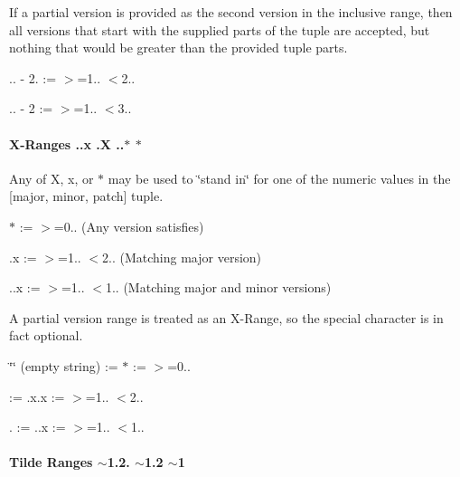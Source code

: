 If a partial version is provided as the second version in the inclusive range, then all versions that start with the supplied parts of the tuple are accepted, but nothing that would be greater than the provided tuple parts.


\begin{DoxyItemize}
\item {.. -\/ 2.} \+:= {\ttfamily $>$=1.. $<$2..}
\item {.. -\/ 2} \+:= {\ttfamily $>$=1.. $<$3..}
\end{DoxyItemize}

\paragraph*{X-\/\+Ranges {..\+x} {.\+X} {..$\ast$} {\ttfamily $\ast$}}

Any of {\ttfamily X}, {\ttfamily x}, or {\ttfamily $\ast$} may be used to \char`\"{}stand in\char`\"{} for one of the numeric values in the {\ttfamily \mbox{[}major, minor, patch\mbox{]}} tuple.


\begin{DoxyItemize}
\item {\ttfamily $\ast$} \+:= {\ttfamily $>$=0..} (Any version satisfies)
\item {.\+x} \+:= {\ttfamily $>$=1.. $<$2..} (Matching major version)
\item {..\+x} \+:= {\ttfamily $>$=1.. $<$1..} (Matching major and minor versions)
\end{DoxyItemize}

A partial version range is treated as an X-\/\+Range, so the special character is in fact optional.


\begin{DoxyItemize}
\item {\ttfamily \char`\"{}\char`\"{}} (empty string) \+:= {\ttfamily $\ast$} \+:= {\ttfamily $>$=0..}
\item {} \+:= {.\+x.\+x} \+:= {\ttfamily $>$=1.. $<$2..}
\item {.} \+:= {..\+x} \+:= {\ttfamily $>$=1.. $<$1..}
\end{DoxyItemize}

\paragraph*{Tilde Ranges {\ttfamily $\sim$1.2.} {\ttfamily $\sim$1.2} {\ttfamily $\sim$1}}

